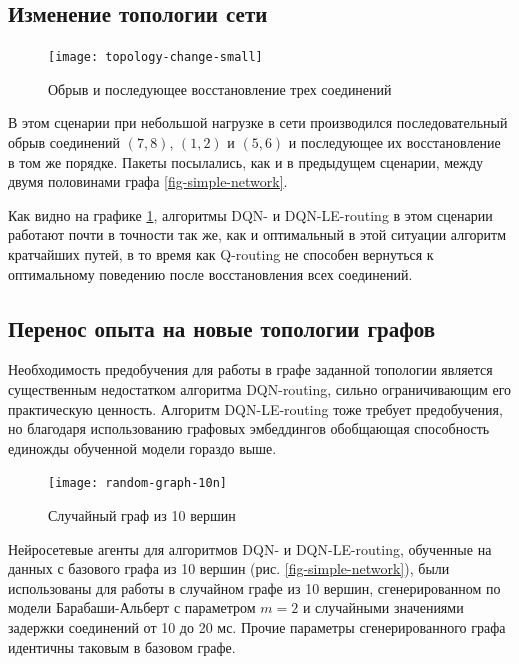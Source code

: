 \documentclass[specification,annotation,times]{itmo-student-thesis}
\theoremstyle{definition}
\begin{document}
\subsection{Изменение топологии сети}\label{experiments:simple/links}

\begin{figure}[!h]
  \caption{Обрыв и последующее восстановление трех соединений}\label{experiments:network:topology-change-small}
  \centering
  \texttt{[image: topology-change-small]}
\end{figure}

В этом сценарии при небольшой нагрузке в сети производился последовательный
обрыв соединений $(7, 8)$, $(1, 2)$ и $(5, 6)$ и последующее их восстановление в том
же порядке. Пакеты посылались, как и в предыдущем сценарии, между двумя
половинами графа \ref{fig-simple-network}.

Как видно на графике \ref{experiments:network:topology-change-small}, алгоритмы
DQN- и DQN-LE-routing в этом сценарии работают почти в точности так же, как и
оптимальный в этой ситуации алгоритм кратчайших путей, в то время как Q-routing
не способен вернуться к оптимальному поведению после восстановления всех
соединений.

\subsection{Перенос опыта на новые топологии графов}

Необходимость предобучения для работы в графе заданной топологии является
существенным недостатком алгоритма DQN-routing, сильно ограничивающим его
практическую ценность. Алгоритм DQN-LE-routing тоже требует предобучения, но
благодаря использованию графовых эмбеддингов обобщающая способность единожды
обученной модели гораздо выше.

\begin{figure}[!h]
  \caption{Случайный граф из 10 вершин}\label{fig-random-net-10n}
  \centering
  \texttt{[image: random-graph-10n]}
\end{figure}

Нейросетевые агенты для алгоритмов DQN- и DQN-LE-routing, обученные на данных с
базового графа из 10 вершин (рис. \ref{fig-simple-network}), были использованы
для работы в случайном графе из 10 вершин, сгенерированном по модели
Барабаши-Альберт с параметром $m = 2$ и случайными значениями задержки
соединений от 10 до 20 мс. Прочие параметры сгенерированного графа идентичны
таковым в базовом графе. 
\end{document}
